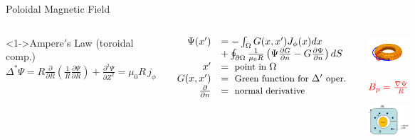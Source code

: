 \documentclass{beamer}
\begin{document}
\begin{frame}{Poloidal Magnetic Field}
\begin{columns}
\begin{block}<1->{Ampere$'$s Law { \small (toroidal comp.)}}
$ \Delta^* \Psi = R \frac{\partial }{\partial R} (\frac{1}{R}  \frac{\partial \Psi }{\partial R} )  + 
	\frac{\partial ^2 \Psi }{\partial Z^2}  = \mu_0 R \, j_\phi 
	$ %
\end{block}	

	$ \begin{array}{rl}     
	  \Psi (x') &= - \int_\Omega G(x,x') J_\phi (x) d x  \\
	  	&+ \oint_{\partial \Omega} \frac{1}{\mu_0 R} \left ( \Psi  \frac{\partial G }{\partial n}  
		 - G \frac{\partial \Psi }{\partial n} \right ) dS \\
		x' &= \textrm{ \small point in } \Omega \\
		G(x,x')  &= \textrm{ \small  Green function for } \Delta ' \textrm{ \small oper.} \\
		 \frac{\partial  }{\partial n}   &= \textrm{ \small normal derivative} 
	 \end{array} $
   	
	\begin{center}
		\includegraphics[width=.7\columnwidth]{torsurf.png}
		
		$\color{red} B_{p} = \frac{\nabla \Psi}{R} $
		
		\includegraphics[width=.55\columnwidth]{xsection.png}
	\end{center}
\end{columns}	
\end{frame}
 
\end{document}
